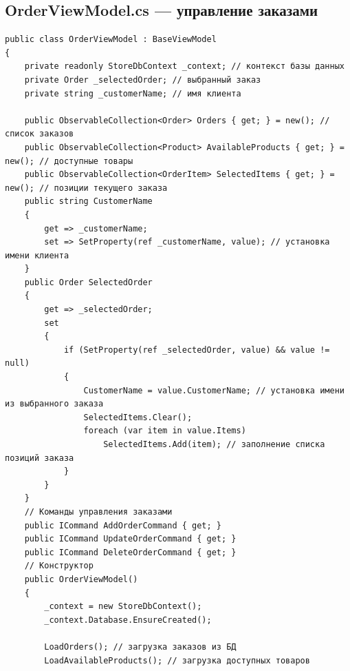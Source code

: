 \documentclass[12pt]{article}
\renewcommand{\texttt}[1]{{\small\ttfamily #1}}
\newenvironment{code}{\captionsetup{type=listing}}{}
\numberwithin{listing}{section}
\numberwithin{figure}{section}
\begin{document}
\subsection{\texttt{OrderViewModel.cs} — управление заказами}
\begin{code}
	\begin{verbatim}
public class OrderViewModel : BaseViewModel
{
    private readonly StoreDbContext _context; // контекст базы данных
    private Order _selectedOrder; // выбранный заказ
    private string _customerName; // имя клиента

    public ObservableCollection<Order> Orders { get; } = new(); // список заказов
    public ObservableCollection<Product> AvailableProducts { get; } = new(); // доступные товары
    public ObservableCollection<OrderItem> SelectedItems { get; } = new(); // позиции текущего заказа
    public string CustomerName
    {
        get => _customerName;
        set => SetProperty(ref _customerName, value); // установка имени клиента
    }
    public Order SelectedOrder
    {
        get => _selectedOrder;
        set
        {
            if (SetProperty(ref _selectedOrder, value) && value != null)
            {
                CustomerName = value.CustomerName; // установка имени из выбранного заказа
                SelectedItems.Clear();
                foreach (var item in value.Items)
                    SelectedItems.Add(item); // заполнение списка позиций заказа
            }
        }
    }
    // Команды управления заказами
    public ICommand AddOrderCommand { get; }
    public ICommand UpdateOrderCommand { get; }
    public ICommand DeleteOrderCommand { get; }
    // Конструктор
    public OrderViewModel()
    {
        _context = new StoreDbContext();
        _context.Database.EnsureCreated();

        LoadOrders(); // загрузка заказов из БД
        LoadAvailableProducts(); // загрузка доступных товаров


\end{verbatim}
\end{code}
\end{document}
